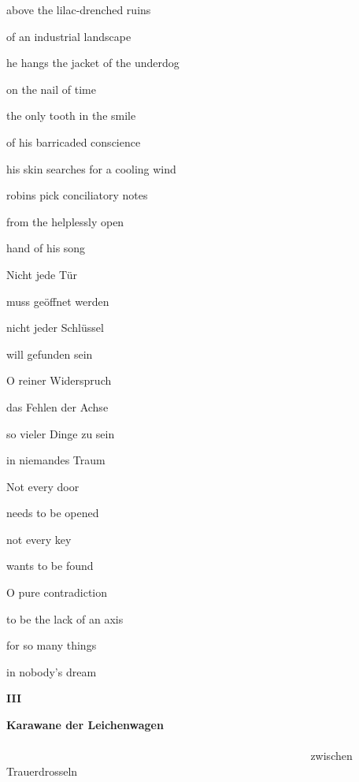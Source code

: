 above the lilac-drenched ruins

of an industrial landscape


\bigskip

he hangs the jacket of the underdog

on the nail of time

the only tooth in the smile

of his barricaded conscience


\bigskip

his skin searches for a cooling wind

robins pick conciliatory notes

from the helplessly open

hand of his song


\bigskip



\bigskip

Nicht jede Tür

muss geöffnet werden

nicht jeder Schlüssel

will gefunden sein


\bigskip

O reiner Widerspruch

das Fehlen der Achse 

so vieler Dinge zu sein

in niemandes Traum


\bigskip



\bigskip

Not every door

needs to be opened

not every key

wants to be found


\bigskip

O pure contradiction

to be the lack of an axis

for so many things

in nobody's dream

\clearpage
\bigskip

{\bfseries
III}

\clearpage
\textbf{Karawane der Leichenwagen
\ \ \ \ \ \ \ \ \ \ \ \ \ \ \ \ \ \ \ \ \ \ \ \ \ \ \ \ \ \ \ \ \ \ \ \ \ \ \ \ \ \ \ \ \ \ \ \ \ \ \ \ \ \ \ \ \ \ \ \ \ \ \ \ \ \ \ \ \ \ \ \ \ \ \ \ \ \ \ \ \ \ \ \ \ \ \ \ \ \ \ \ \ \ \ \ \ \ \ \ \ \ \ \ \ \ \ \ \ \ }zwischen
Trauerdrosseln

